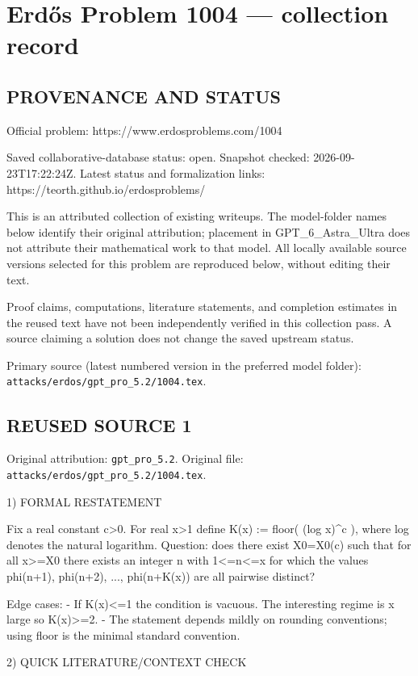 \section*{Erd\H{o}s Problem 1004 --- collection record}

\subsection*{PROVENANCE AND STATUS}
Official problem: https://www.erdosproblems.com/1004

Saved collaborative-database status: open.
Snapshot checked: 2026-09-23T17:22:24Z.
Latest status and formalization links: https://teorth.github.io/erdosproblems/

This is an attributed collection of existing writeups. The model-folder names below identify their original attribution; placement in GPT\_6\_Astra\_Ultra does not attribute their mathematical work to that model. All locally available source versions selected for this problem are reproduced below, without editing their text.

Proof claims, computations, literature statements, and completion estimates in the reused text have not been independently verified in this collection pass. A source claiming a solution does not change the saved upstream status.

Primary source (latest numbered version in the preferred model folder): \texttt{attacks/erdos/gpt\_pro\_5.2/1004.tex}.

\subsection*{REUSED SOURCE 1}
Original attribution: \texttt{gpt\_pro\_5.2}.
Original file: \texttt{attacks/erdos/gpt\_pro\_5.2/1004.tex}.


1) FORMAL RESTATEMENT

Fix a real constant c>0. For real x>1 define
  K(x) := floor( (log x)^c ),
where log denotes the natural logarithm.
Question: does there exist X0=X0(c) such that for all x>=X0 there exists an integer n with 1<=n<=x for which the values
  phi(n+1), phi(n+2), ..., phi(n+K(x))
are all pairwise distinct?

Edge cases:
- If K(x)<=1 the condition is vacuous. The interesting regime is x large so K(x)>=2.
- The statement depends mildly on rounding conventions; using floor is the minimal standard convention.

2) QUICK LITERATURE/CONTEXT CHECK


